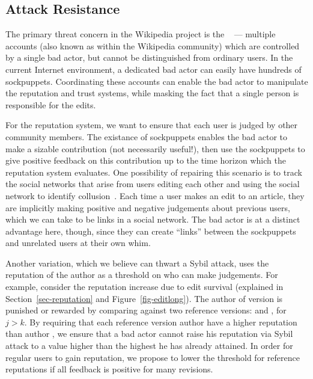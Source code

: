 \subsection{Attack Resistance}

The primary threat concern in the Wikipedia project is the
~\cite{Douceur02,Sybil05,TrustSybil05,SybilOverview} ---
multiple accounts (also known as  within
the Wikipedia community)
which are controlled by a single bad actor,
but cannot be distinguished from ordinary users.
In the current Internet environment,
a dedicated bad actor can easily have hundreds of sockpuppets.
Coordinating these accounts can enable the bad actor
to manipulate the reputation and trust systems,
while masking the fact that a single person is
responsible for the edits.

For the reputation system, we want to ensure that each
user is judged by other community members.
The existance of sockpuppets enables the bad actor
to make a sizable contribution (not necessarily useful!),
then use the sockpuppets to give positive feedback on
this contribution up to the time horizon which the reputation
system evaluates.
One possibility of repairing this scenario is to track
the social networks that arise from users editing each other
and using the social network to identify collusion~\cite{HMS02,MSI02}.
Each time a user makes an edit to an article, they are implicitly
making positive and negative judgements about previous users,
which we can take to be links in a social network.
The bad actor is at a distinct advantage here, though,
since they can create ``links'' between the sockpuppets
and unrelated users at their own whim.

Another variation, which we believe can thwart a Sybil attack,
uses the reputation of the author as a threshold on who
can make judgements.
For example, consider the reputation increase due to
edit survival (explained in Section~\ref{sec-reputation}
and Figure~\ref{fig-editlong}).
The author  of version  is punished or
rewarded by comparing  against two reference
versions:  and , for $j > k$.
By requiring that each reference version author have a higher
reputation than author , we ensure that a bad
actor cannot raise his reputation via Sybil attack
to a value higher than the highest he has already attained.
In order for regular users to gain reputation, we propose
to lower the threshold for reference reputations if all feedback
is positive for many revisions.


